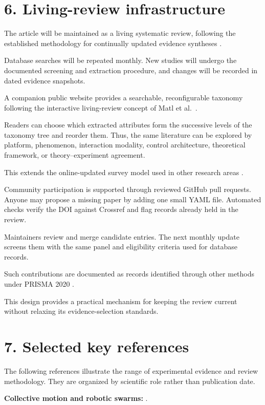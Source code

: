 \section*{6. Living-review infrastructure}

The article will be maintained as a living
systematic review, following the established
methodology for continually updated
evidence syntheses
\cite{Elliott2014living,Elliott2017living}.

Database searches will be repeated monthly.
New studies will undergo the documented
screening and extraction procedure,
and changes will be recorded in
dated evidence snapshots.

A companion public website provides
a searchable, reconfigurable taxonomy
following the interactive living-review
concept of Matl et al.~\cite{Matl2017vascular}.

Readers can choose which extracted
attributes form the successive levels
of the taxonomy tree and reorder them.
Thus, the same literature can be explored
by platform, phenomenon, interaction
modality, control architecture,
theoretical framework, or
theory--experiment agreement.

This extends the online-updated survey
model used in other research areas
\cite{Litjens2017survey}.

Community participation is supported
through reviewed GitHub pull requests.
Anyone may propose a missing paper
by adding one small YAML file.
Automated checks verify the DOI
against Crossref and flag records
already held in the review.

Maintainers review and merge candidate
entries. The next monthly update
screens them with the same panel
and eligibility criteria used
for database records.

Such contributions are documented
as records identified through
other methods under PRISMA 2020
\cite{Page2021prisma}.

This design provides a practical
mechanism for keeping the review
current without relaxing its
evidence-selection standards.

\section*{7. Selected key references}

The following references illustrate the
range of experimental evidence and
review methodology. They are organized
by scientific role rather than
publication date.

\noindent\textbf{Collective motion and robotic swarms:}
\cite{Turgut2008selforganizedflocka,Tarcai2011patternstransition,Rubenstein2014programmableselfas,Vsrhelyi2018optimizedflockingo,Zhou2024anticipationpromote}.

